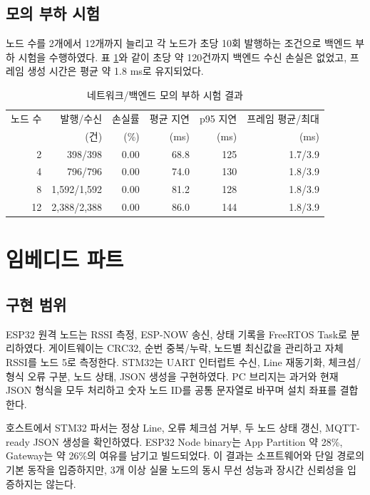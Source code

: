 \documentclass[titlepage]{pnureport}
\begin{document}
\subsection{모의 부하 시험}

노드 수를 2개에서 12개까지 늘리고 각 노드가 초당 10회 발행하는 조건으로 백엔드 부하 시험을 수행하였다. 표 \ref{tab:load-test}와 같이 초당 약 120건까지 백엔드 수신 손실은 없었고, 프레임 생성 시간은 평균 약 1.8 ms로 유지되었다.

\begin{table}[H]
\centering
\caption{네트워크/백엔드 모의 부하 시험 결과}
\label{tab:load-test}
\small
\begin{tabular}{rrrrrr}
\toprule
노드 수 & 발행/수신 & 손실률 & 평균 지연 & p95 지연 & 프레임 평균/최대 \\
 & (건) & (\%) & (ms) & (ms) & (ms) \\
\midrule
2  & 398/398     & 0.00 & 68.8 & 125 & 1.7/3.9 \\
4  & 796/796     & 0.00 & 74.0 & 130 & 1.8/3.9 \\
8  & 1,592/1,592 & 0.00 & 81.2 & 128 & 1.8/3.9 \\
12 & 2,388/2,388 & 0.00 & 86.0 & 144 & 1.8/3.9 \\
\bottomrule
\end{tabular}
\end{table}

\section{임베디드 파트}

\subsection{구현 범위}

ESP32 원격 노드는 RSSI 측정, ESP-NOW 송신, 상태 기록을 FreeRTOS Task로 분리하였다. 게이트웨이는 CRC32, 순번 중복/누락, 노드별 최신값을 관리하고 자체 RSSI를 노드 5로 측정한다. STM32는 UART 인터럽트 수신, Line 재동기화, 체크섬/형식 오류 구분, 노드 상태, JSON 생성을 구현하였다. PC 브리지는 과거와 현재 JSON 형식을 모두 처리하고 숫자 노드 ID를 공통 문자열로 바꾸며 설치 좌표를 결합한다.

호스트에서 STM32 파서는 정상 Line, 오류 체크섬 거부, 두 노드 상태 갱신, MQTT-ready JSON 생성을 확인하였다. ESP32 Node binary는 App Partition 약 28\%, Gateway는 약 26\%의 여유를 남기고 빌드되었다. 이 결과는 소프트웨어와 단일 경로의 기본 동작을 입증하지만, 3개 이상 실물 노드의 동시 무선 성능과 장시간 신뢰성을 입증하지는 않는다.
\end{document}
